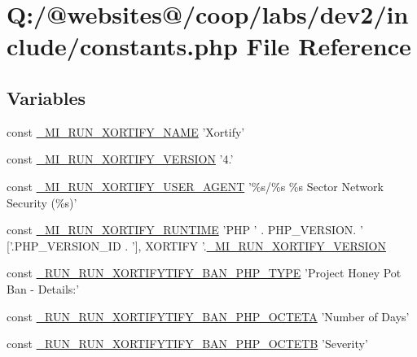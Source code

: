 \hypertarget{constants_8php}{\section{Q\-:/@websites@/coop/labs/dev2/include/constants.php File Reference}
\label{constants_8php}
}
\subsection*{Variables}
\begin{DoxyCompactItemize}
\item 
const \hyperlink{constants_8php_a704650773637cd5d8c0b8e5394260ece}{\-\_\-\-M\-I\-\_\-\-R\-U\-N\-\_\-\-X\-O\-R\-T\-I\-F\-Y\-\_\-\-N\-A\-M\-E} 'Xortify'
\item 
const \hyperlink{constants_8php_a31e07a7bc0b259b3ea2a324bad098566}{\-\_\-\-M\-I\-\_\-\-R\-U\-N\-\_\-\-X\-O\-R\-T\-I\-F\-Y\-\_\-\-V\-E\-R\-S\-I\-O\-N} '4.'
\item 
const \hyperlink{constants_8php_af2899512f82eb55009832a37ad85a376}{\-\_\-\-M\-I\-\_\-\-R\-U\-N\-\_\-\-X\-O\-R\-T\-I\-F\-Y\-\_\-\-U\-S\-E\-R\-\_\-\-A\-G\-E\-N\-T} '\%s/\%s \%s Sector Network Security (\%s)'
\item 
const \hyperlink{constants_8php_a88274efaf5cf689c9e9f9d4b15690102}{\-\_\-\-M\-I\-\_\-\-R\-U\-N\-\_\-\-X\-O\-R\-T\-I\-F\-Y\-\_\-\-R\-U\-N\-T\-I\-M\-E} 'P\-H\-P ' . P\-H\-P\-\_\-\-V\-E\-R\-S\-I\-O\-N. ' \mbox{[}'.P\-H\-P\-\_\-\-V\-E\-R\-S\-I\-O\-N\-\_\-\-I\-D . '\mbox{]}, X\-O\-R\-T\-I\-F\-Y '.\hyperlink{constants_8php_a31e07a7bc0b259b3ea2a324bad098566}{\-\_\-\-M\-I\-\_\-\-R\-U\-N\-\_\-\-X\-O\-R\-T\-I\-F\-Y\-\_\-\-V\-E\-R\-S\-I\-O\-N}
\item 
const \hyperlink{constants_8php_a1b6cbcbccf9c0755b2e9ea2729f5a485}{\-\_\-\-R\-U\-N\-\_\-\-R\-U\-N\-\_\-\-X\-O\-R\-T\-I\-F\-Y\-T\-I\-F\-Y\-\_\-\-B\-A\-N\-\_\-\-P\-H\-P\-\_\-\-T\-Y\-P\-E} 'Project Honey Pot Ban -\/ Details\-:'
\item 
const \hyperlink{constants_8php_adbae3f10112888ca7913fd12cf77f9aa}{\-\_\-\-R\-U\-N\-\_\-\-R\-U\-N\-\_\-\-X\-O\-R\-T\-I\-F\-Y\-T\-I\-F\-Y\-\_\-\-B\-A\-N\-\_\-\-P\-H\-P\-\_\-\-O\-C\-T\-E\-T\-A} 'Number of Days'
\item 
const \hyperlink{constants_8php_a97582a7b9a3c5af0e14f825fb652f2e3}{\-\_\-\-R\-U\-N\-\_\-\-R\-U\-N\-\_\-\-X\-O\-R\-T\-I\-F\-Y\-T\-I\-F\-Y\-\_\-\-B\-A\-N\-\_\-\-P\-H\-P\-\_\-\-O\-C\-T\-E\-T\-B} 'Severity'
\item 

\end{DoxyCompactItemize}
